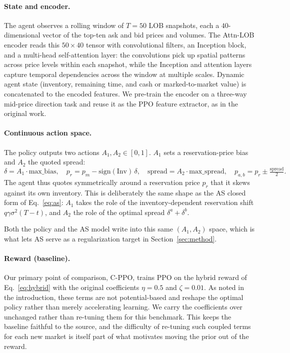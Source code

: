 \documentclass{article}
\newcommand{\cppo}{\textsc{C-PPO}}
\begin{document}
\paragraph{State and encoder.} The agent observes a rolling window of
$T\!=\!50$ LOB snapshots, each a $40$-dimensional vector of the top-ten
ask and bid prices and volumes. The Attn-LOB encoder reads this $50\times40$ tensor with convolutional filters, an Inception block, and a multi-head self-attention layer: the
convolutions pick up spatial patterns across price levels within each
snapshot, while the Inception and attention layers capture temporal
dependencies across the window at multiple scales. Dynamic agent state
(inventory, remaining time, and cash or marked-to-market value) is concatenated to the encoded features. We pre-train the encoder on a three-way mid-price direction task and reuse it as the PPO feature extractor, as in the original work.


\paragraph{Continuous action space.} The policy outputs two actions
$A_1,A_2\in[0,1]$. $A_1$ sets a reservation-price bias and $A_2$ the
quoted spread:
\begin{equation}
\delta = A_1 \cdot \text{max\_bias}, \quad
p_r = p_m - \mathrm{sign}(\mathrm{Inv})\,\delta, \quad
\text{spread} = A_2 \cdot \text{max\_spread}, \quad
p_{a,b} = p_r \pm \tfrac{\text{spread}}{2}.
\label{eq:action}
\end{equation}
The agent thus quotes symmetrically around a reservation price $p_r$ that it skews against its own inventory. This is deliberately the same shape as the AS closed form of Eq.~\eqref{eq:as}: $A_1$ takes the role of the inventory-dependent reservation shift $q\gamma\sigma^2(T-t)$, and $A_2$ the role of the optimal spread $\delta^a+\delta^b$.

Both the policy and the AS model write into this same $(A_1,A_2)$ space, which is what lets AS serve as a regularization target in Section~\ref{sec:method}.

\paragraph{Reward (baseline).}

Our primary point of comparison, \cppo{}, trains PPO on the hybrid reward of Eq.~\eqref{eq:hybrid} with the original coefficients $\eta=0.5$ and $\zeta=0.01$. As noted in the introduction, these terms are not potential-based \citep{ng1999} and reshape the optimal policy rather than merely accelerating learning. We carry the coefficients over unchanged rather than re-tuning them for this benchmark. This keeps the baseline faithful to the source, and the difficulty of re-tuning such coupled terms for each new market is itself part of what motivates moving the prior out of the reward.
\end{document}
